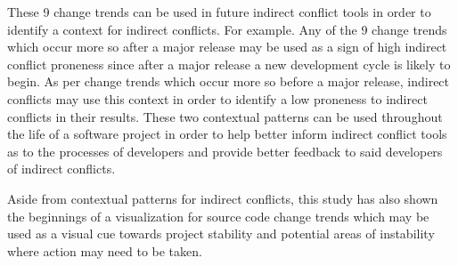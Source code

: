 These 9 change trends can be used in future indirect conflict tools in order to identify a context for indirect conflicts.
For example. Any of the 9 change trends which occur more so after a major release may be used as a sign of high indirect conflict proneness
since after a major release a new development cycle is likely to begin. As per change trends which occur more so before a major release, indirect
conflicts may use this context in order to identify a low proneness to indirect conflicts in their results. These two contextual patterns
can be used throughout the life of a software project in order to help better inform indirect conflict tools as to the processes of developers
and provide better feedback to said developers of indirect conflicts.

Aside from contextual patterns for indirect conflicts, this study has also shown the beginnings of a visualization for source code change trends which may
be used as a visual cue towards project stability and potential areas of instability where action may need to be taken.